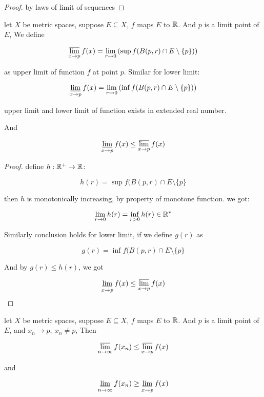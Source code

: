 \begin{proof}
    by laws of limit of sequences
\end{proof}

\begin{definition}
    let $X$ be metric spaces, suppose $E \subseteq X$, $f$ maps $E$ to $\mathbb{R}$. 
    And $p$ is a limit point of $E$, We define 

    \[
        \varlimsup_{x \to p}f(x) = \lim_{r \to 0} \left( \sup f(B(p, r) \cap E \setminus \{ p \}) \right)
    \]

    as upper limit of function $f$ at point $p$. Similar for lower limit:

    \[
        \varliminf_{x \to p}f(x) = \lim_{r \to 0} \left(\inf f(B(p, r) \cap E \setminus \{ p \}) \right)
    \]
\end{definition}

\begin{thm}
    upper limit and lower limit of function exists in extended real number.

    And

    \[
        \varliminf_{x \to p}f(x) \le \varlimsup_{x \to p}f(x)
    \]
\end{thm}

\begin{proof}
    define $h: \mathbb{R}^+ \to \mathbb{R}$:

    \[
        h(r) = \sup f(B(p, r) \cap E \setminus \{ p \}
    \]

    then $h$ is monotonically increasing, by property of monotone function. we got:

    \[
        \lim_{r \to 0}h(r) = \inf_{r > 0} h(r) \in \mathbb{R}^*
    \]

    Similarly conclusion holds for lower limit, if we define $g(r)$ as

    
    \[
        g(r) = \inf f(B(p, r) \cap E \setminus \{ p \}
    \]

    And by $g(r) \le h(r)$, we got

    \[
        \varliminf_{x \to p}f(x) \le \varlimsup_{x \to p}f(x)
    \]
\end{proof}

\begin{thm}
    \label{thm:limsup-of-mapped-seq-le-limsup-of-func}
    let $X$ be metric spaces, suppose $E \subseteq X$, $f$ maps $E$ to $\mathbb{R}$. 
    And $p$ is a limit point of $E$, and $x_n \to p,\: x_n \ne p$, Then

    \[
        \varlimsup_{n \to \infty} f(x_n) \le \varlimsup_{x \to p}f(x)
    \]

    and


    \[
        \varliminf_{n \to \infty} f(x_n) \ge \varliminf_{x \to p}f(x)
    \]
\end{thm}

